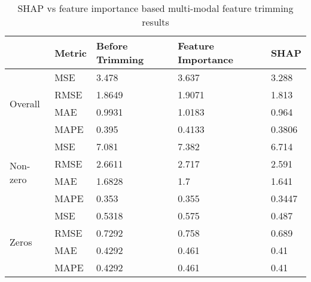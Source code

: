 \documentclass{article}
\begin{document}
\begin{table}[]
\begin{tabular}{||l|l|l|l|l||}
\hline
& Metric & Before Trimming & Feature Importance & SHAP   \\ \hline
\multirow{4}{*}{Overall}  
& MSE   & 3.478   & 3.637  & 3.288     \\ \cline{2-5} 
& RMSE  & 1.8649  & 1.9071 & 1.813     \\ \cline{2-5} 
& MAE   & 0.9931  & 1.0183 & 0.964     \\ \cline{2-5} 
& MAPE  & 0.395   & 0.4133 & 0.3806    \\ \hline\hline
\multirow{4}{*}{Non-zero} 
& MSE   & 7.081   & 7.382  & 6.714     \\ \cline{2-5} 
& RMSE  & 2.6611  & 2.717  & 2.591     \\ \cline{2-5} 
& MAE   & 1.6828  & 1.7    & 1.641     \\ \cline{2-5} 
& MAPE  & 0.353   & 0.355  & 0.3447    \\ \hline\hline
\multirow{4}{*}{Zeros}    
& MSE   & 0.5318  & 0.575  & 0.487   \\ \cline{2-5} 
& RMSE  & 0.7292  & 0.758  & 0.689   \\ \cline{2-5} 
& MAE   & 0.4292  & 0.461  & 0.41    \\ \cline{2-5} 
& MAPE  & 0.4292  & 0.461  & 0.41    \\ \hline

\end{tabular}
\caption{SHAP vs feature importance based multi-modal feature trimming results}
\label{t:SHAP_improved_regression_results}
\end{table}
\end{document}
